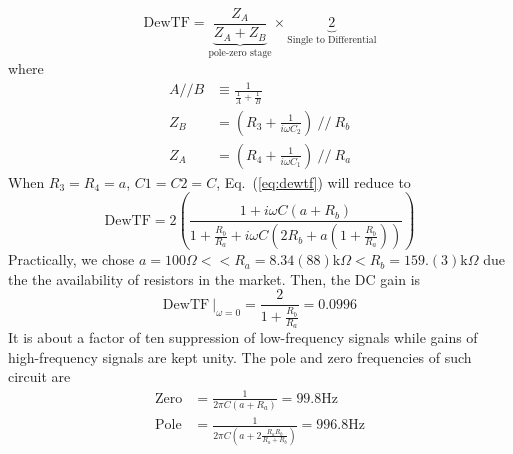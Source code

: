 \begin{equation}
\label{eq:dewtf}
    \mathrm{DewTF} = \underbrace{\frac{Z_A}{Z_A+Z_B}}_{\text{pole-zero stage}} \times \underbrace{2}_{\text{Single to Differential}}
\end{equation}
where
\begin{align}
    A//B &\equiv \frac{1}{\frac{1}{A}+\frac{1}{B}} \\
    Z_B &= ( R_3 + \frac{1}{i \omega C_2} )~ //~ R_b \\
    Z_A &= ( R_4 + \frac{1}{i \omega C_1} )~ //~ R_a
\end{align}
When $R_3=R_4=a$, $C1=C2=C$, Eq.~(\ref{eq:dewtf}) will reduce to 
\begin{equation}
    \mathrm{DewTF} = 2 \left( \frac{1+i \omega C (a+ R_b)}{1+\frac{R_b}{R_a} + i \omega C (2 R_b + a(1+\frac{R_b}{R_a}))} \right)
\end{equation}
Practically, we chose $a=100\Omega << R_a =8.34(88)\mathrm{k}\Omega < R_b =159.(3)\mathrm{k}\Omega $ due the the availability of resistors in the market. Then, the DC gain is 
\begin{equation}
    \mathrm{DewTF}\ \rvert_{\omega=0} = \frac{2}{1+\frac{R_b}{R_a}} = 0.0996
\end{equation}
It is about a factor of ten suppression of low-frequency signals while gains of high-frequency signals are kept unity.
The pole and zero frequencies of such circuit are
\begin{align}
    \mathrm{Zero} &= \frac{1}{2 \pi C (a+R_a)} = 99.8 \mathrm{Hz} \\
    \mathrm{Pole} &= \frac{1}{2 \pi C (a+2\frac{R_a R_b}{R_a+R_b})} = 996.8 \mathrm{Hz}
\end{align}

